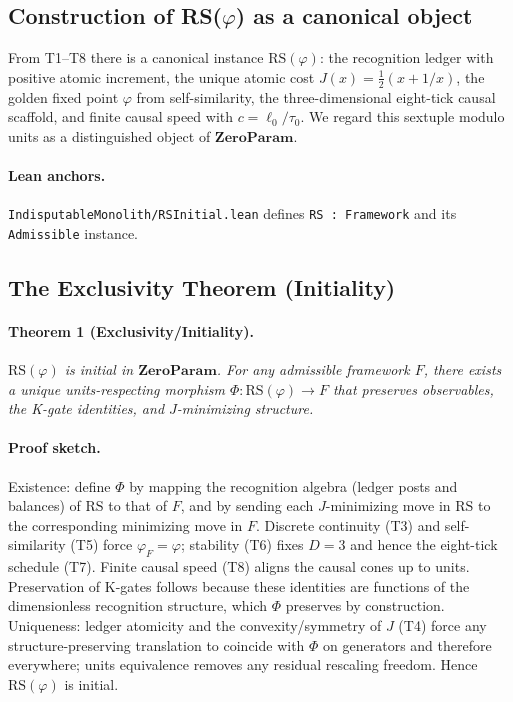 \documentclass[11pt]{article}
\begin{document}
\subsection{Construction of RS(\(\varphi\)) as a canonical object}
From T1--T8 there is a canonical instance \(\mathrm{RS}(\varphi)\): the recognition ledger with positive atomic increment, the unique atomic cost \(J(x)=\tfrac{1}{2}(x+1/x)\), the golden fixed point \(\varphi\) from self\mbox{-}similarity, the three\mbox{-}dimensional eight\mbox{-}tick causal scaffold, and finite causal speed with \(c=\ell_0/\tau_0\). We regard this sextuple modulo units as a distinguished object of \(\mathbf{ZeroParam}\).

\paragraph{Lean anchors.} \texttt{IndisputableMonolith/RSInitial.lean} defines \texttt{RS : Framework} and its \texttt{Admissible} instance.

\subsection{The Exclusivity Theorem (Initiality)}
\paragraph{Theorem 1 (Exclusivity/Initiality).} \emph{\(\mathrm{RS}(\varphi)\) is initial in \(\mathbf{ZeroParam}\). For any admissible framework \(F\), there exists a unique units\mbox{-}respecting morphism \(\Phi\colon \mathrm{RS}(\varphi)\to F\) that preserves observables, the K\mbox{-}gate identities, and \(J\)\mbox{-}minimizing structure.}

\paragraph{Proof sketch.} Existence: define \(\Phi\) by mapping the recognition algebra (ledger posts and balances) of \(\mathrm{RS}\) to that of \(F\), and by sending each \(J\)\mbox{-}minimizing move in \(\mathrm{RS}\) to the corresponding minimizing move in \(F\). Discrete continuity (T3) and self\mbox{-}similarity (T5) force \(\varphi_F=\varphi\); stability (T6) fixes \(D=3\) and hence the eight\mbox{-}tick schedule (T7). Finite causal speed (T8) aligns the causal cones up to units. Preservation of K\mbox{-}gates follows because these identities are functions of the dimensionless recognition structure, which \(\Phi\) preserves by construction. Uniqueness: ledger atomicity and the convexity/symmetry of \(J\) (T4) force any structure\mbox{-}preserving translation to coincide with \(\Phi\) on generators and therefore everywhere; units equivalence removes any residual rescaling freedom. Hence \(\mathrm{RS}(\varphi)\) is initial.
\end{document}
